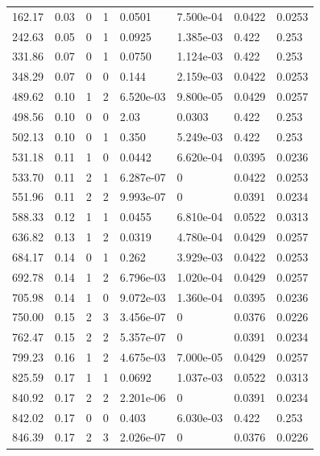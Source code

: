 \documentclass[preview]{standalone}
\begin{document}
{{\begin{tabular}{L{1.2cm}C{1.2cm} C{0.3cm}C{0.5cm} C{1.4cm}C{1.4cm} C{1.4cm}C{1.4cm}}
  162.17  &  0.03  & 0     &  1 &  0.0501  & 7.500e-04  & 0.0422 &  0.0253   \\ 
  242.63  &  0.05  & 0     &  1 &  0.0925  & 1.385e-03  & 0.422 &  0.253   \\ 
  331.86  &  0.07  & 0     &  1 &  0.0750  & 1.124e-03  & 0.422 &  0.253   \\ 
  348.29  &  0.07  & 0     &  0 &  0.144  & 2.159e-03  & 0.0422 &  0.0253   \\ 
  489.62  &  0.10  & 1     &  2 &  6.520e-03  & 9.800e-05  & 0.0429 &  0.0257   \\ 
  498.56  &  0.10  & 0     &  0 &  2.03  & 0.0303  & 0.422 &  0.253   \\ 
  502.13  &  0.10  & 0     &  1 &  0.350  & 5.249e-03  & 0.422 &  0.253   \\ 
  531.18  &  0.11  & 1     &  0 &  0.0442  & 6.620e-04  & 0.0395 &  0.0236   \\ 
  533.70  &  0.11  & 2     &  1 &  6.287e-07  & 0  & 0.0422 &  0.0253   \\ 
  551.96  &  0.11  & 2     &  2 &  9.993e-07  & 0  & 0.0391 &  0.0234   \\ 
  588.33  &  0.12  & 1     &  1 &  0.0455  & 6.810e-04  & 0.0522 &  0.0313   \\ 
  636.82  &  0.13  & 1     &  2 &  0.0319  & 4.780e-04  & 0.0429 &  0.0257   \\ 
  684.17  &  0.14  & 0     &  1 &  0.262  & 3.929e-03  & 0.0422 &  0.0253   \\ 
  692.78  &  0.14  & 1     &  2 &  6.796e-03  & 1.020e-04  & 0.0429 &  0.0257   \\ 
  705.98  &  0.14  & 1     &  0 &  9.072e-03  & 1.360e-04  & 0.0395 &  0.0236   \\ 
  750.00  &  0.15  & 2     &  3 &  3.456e-07  & 0  & 0.0376 &  0.0226   \\ 
  762.47  &  0.15  & 2     &  2 &  5.357e-07  & 0  & 0.0391 &  0.0234   \\ 
  799.23  &  0.16  & 1     &  2 &  4.675e-03  & 7.000e-05  & 0.0429 &  0.0257   \\ 
  825.59  &  0.17  & 1     &  1 &  0.0692  & 1.037e-03  & 0.0522 &  0.0313   \\ 
  840.92  &  0.17  & 2     &  2 &  2.201e-06  & 0  & 0.0391 &  0.0234   \\ 
  842.02  &  0.17  & 0     &  0 &  0.403  & 6.030e-03  & 0.422 &  0.253   \\ 
  846.39  &  0.17  & 2     &  3 &  2.026e-07  & 0  & 0.0376 &  0.0226   \\ 

\end{tabular}}}
\end{document}
